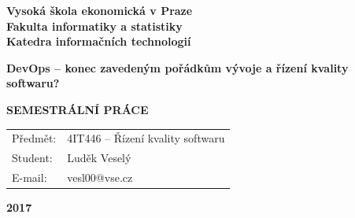 \documentclass[FM,DP]{tulthesis}
\begin{document}

{\thispagestyle{empty}

\begin{center}
\bfseries
\LARGE
Vysok\'a \v skola ekonomick\'a v Praze\\ 
\vspace{3mm}
\Large
Fakulta informatiky a statistiky\\\vspace{1mm}
\vspace{1mm}
Katedra informa\v cn\'ich technologi\'i
\vspace{3cm}
\end{center}

\vfill

\begin{center}
\Huge\bfseries
DevOps -- konec zavedeným pořádkům vývoje a řízení kvality softwaru?
\par
\vspace{15mm}
\end{center}

\begin{center}
\Large\bfseries
\MakeUppercase{Semestrální práce}
\vspace{3cm}
\end{center}

\vfill

\list{}{\leftmargin=2.7cm}\item[]
\large\noindent\begin{tabularx}{\linewidth}{@{}lX@{}}
\color{tulgray}%
Předmět: & 4IT446 -- Řízení kvality softwaru \\
\color{tulgray}%
Student: & Luděk Veselý \\
\color{tulgray}%
E-mail: & vesl00@vse.cz \\
\end{tabularx}
\endlist
\list{}{\leftmargin=-3.1cm}\item[]
\endlist

\vfill

\begin{center}
\Large\bfseries
2017
\end{center}

\vspace*{-1cm}
\cleardoublepage}


\setcounter{page}{2}
\tableofcontents
\clearpage

%
%
\end{document}
